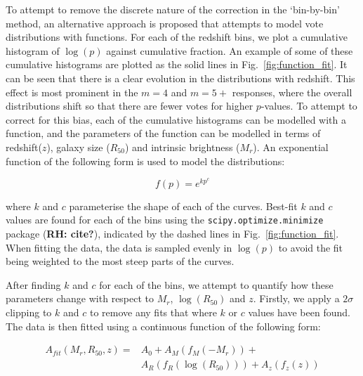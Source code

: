 \documentclass[useAMS,usenatbib]{mn2e}
\newcommand{\rh}[1]{{\bf \textcolor{RoyalPurple}{RH: #1}}}
\begin{document}
To attempt to remove the discrete nature of the correction in the `bin-by-bin' method, an alternative approach is proposed that attempts to model vote distributions with functions. For each of the redshift bins, we plot a cumulative histogram of $\log(p)$ against cumulative fraction. An example of some of these cumulative histograms are plotted as the solid lines in Fig.~\ref{fig:function_fit}. It can be seen that there is a clear evolution in the distributions with redshift. This effect is most prominent in the $m=4$ and $m=5+$ responses, where the overall distributions shift so that there are fewer votes for higher $p$-values. To attempt to correct for this bias, each of the cumulative histograms can be modelled with a function, and the parameters of the function can be modelled in terms of redshift($z$), galaxy size ($R_{50}$) and intrinsic brightness ($M_r$). An exponential function of the following form is used to model the distributions:

\begin{equation}
f(p) = e^{kp^{c}}
\end{equation}

where $k$ and $c$ parameterise the shape of each of the curves. Best-fit $k$ and $c$ values are found for each of the bins using the \texttt{scipy.optimize.minimize} package (\rh{cite?}), indicated by the dashed lines in Fig.~\ref{fig:function_fit}. When fitting the data, the data is sampled evenly in $\log(p)$ to avoid the fit being weighted to the most steep parts of the curves. 

After finding $k$ and $c$ for each of the bins, we attempt to quantify how these parameters change with respect to $M_r$, $\log(R_{50})$ and $z$. Firstly, we apply a $2\sigma$ clipping to $k$ and $c$ to remove any fits that where $k$ or $c$ values have been found. The data is then fitted using a continuous function of the following form:

\begin{equation}
\begin{split}
A_{fit}(M_r,R_{50},z) = & A_0 + A_M(f_M(-M_r)) +\\
						& A_R(f_R(\log({R_{50}}))) + A_z(f_z(z))
\end{split}
\end{equation}
\end{document}
